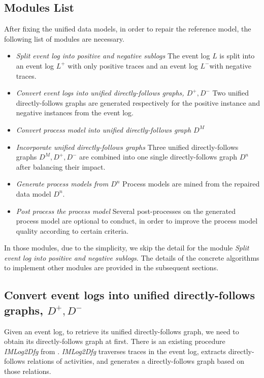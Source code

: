 \subsection{Modules List}
After fixing the unified data models, in order to repair the reference model, the following list of modules are necessary. 
\begin{itemize}
	\item \emph{Split event log into positive and negative sublogs } \quad
	The event log $L$ is split into an event log $L^+$ with only positive traces and an event log $L^-$with negative traces.
	\item \emph{Convert event logs into unified directly-follows graphs, $D^+, D^-$}\quad 
	Two unified directly-follows graphs are generated respectively for the positive instance and negative instances from the event log.
	\item \emph{Convert process model into unified directly-follows graph $D^M$}\quad 
	\item \emph{Incorporate unified directly-follows graphs} \quad
	Three unified directly-follows  graphs $D^M, D^+, D^-$ are combined into one single directly-follows graph $D^n$ after balancing their impact.
	\item \emph{Generate process models from $D^n$} \quad
	Process models are mined from the repaired data model $D^n$.
	\item \emph{Post process the process model} \quad
	Several post-processes on the generated process model are optional to conduct, in order to improve the process model quality according to certain criteria.
\end{itemize}
In those modules, due to the simplicity, we skip the detail for the module \emph{Split event log into positive and negative sublogs}. The details of the concrete algorithms to implement other modules are provided in the subsequent sections.
\subsection{Convert event logs into unified directly-follows graphs, $D^+, D^-$}
Given an event log, to retrieve its unified directly-follows graph, we need to obtain its directly-follows graph at first. There is an existing procedure \emph{IMLog2Dfg} from \cite{leemans2013discovering}. \emph{IMLog2Dfg} traverses traces in the event log, extracts directly-follows relations of activities, and generates a directly-follows graph based on those relations. 


